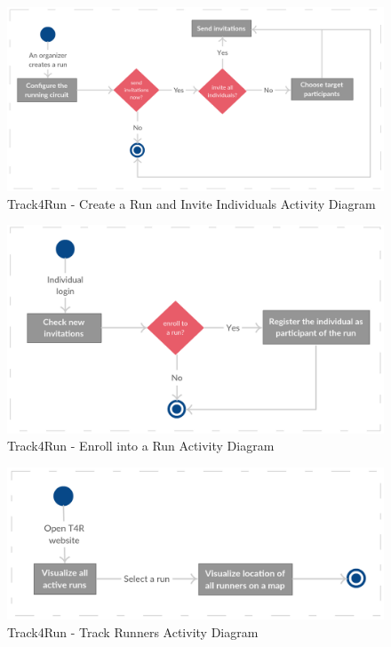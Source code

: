 \documentclass[a4paper, hidelinks, 12pt]{report}
\begin{document}
	\begin{figure}[H]
		\centering
		\includegraphics[scale=0.55]{Diagrams/t4r_create_run_activity_diagram.png}
		\caption[Track4Run - Create a Run and Invite Individuals  Activity Diagram]{Track4Run - Create a Run and Invite Individuals Activity Diagram}
		\label{fig:t4r_act_create_run}
	\end{figure}
	
	\begin{figure}[H]
		\centering
		\includegraphics[scale=0.55]{Diagrams/t4r_enrolment_activity_diagram.png}
		\caption[Track4Run - Enroll into a Run Activity Diagram]{Track4Run - Enroll into a Run Activity Diagram}
		\label{fig:t4r_act_enrolment}
	\end{figure}
	
	\begin{figure}[H]
		\centering
		\includegraphics[scale=0.55]{Diagrams/t4r_track_runners_activity_diagram.png}
		\caption[Track4Run - Track Runners Activity Diagram]{Track4Run - Track Runners Activity Diagram}
		\label{fig:t4r_act_track_runners}
	\end{figure}
	
\end{document}
